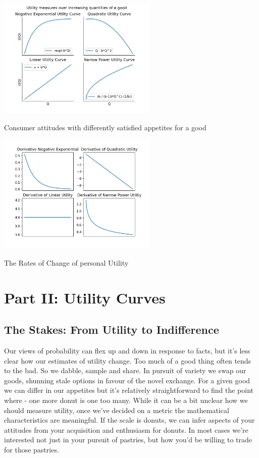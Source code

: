 \documentclass{tufte-handout}
\begin{document}
\begin{marginfigure}
\includegraphics[width=3in]{Plots/utility_in_1_dimension.png}
\caption{Consumer attitudes with differently satisfied appetites for a good}
\includegraphics[width=3in]{Plots/derivatives_of_utility.png}
\caption{The Rates of Change of personal Utility}
\end{marginfigure} 


\section{\textbf{Part II: Utility Curves}}

\subsection{The Stakes: From Utility to Indifference}
\label{sec:Utility}
Our views of probability can flex up and down in response to facts, but it's less clear how our estimates of utility change. Too much of a good thing often tends to the bad. So we dabble, sample and share. In pursuit of variety we swap our goods, shunning stale options in favour of the novel exchange.  For a given good we can differ in our appetites but it's relatively straightforward to find the point where - one more donut is one too many. While it can be a bit unclear how we should measure utility, once we've decided on a metric the mathematical characteristics are meaningful. If the scale is donuts, we can infer aspects of your attitudes from your acquisition and enthusiasm for donuts. In most cases we're interested not just in your pursuit of pastries, but how you'd be willing to trade for those pastries. \linebreak
\end{document}
